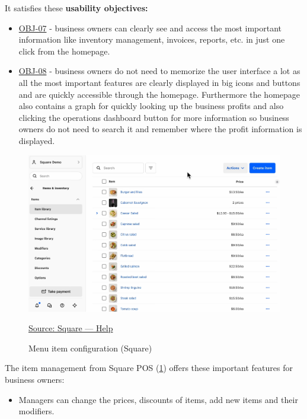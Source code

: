 \documentclass[]{VUMIFTemplateClass}
\begin{document}
It satisfies these \textbf{usability objectives:}

\begin{itemize}
    \item \hyperref[OBJ-07]{OBJ-07} - business owners can clearly see and access the most important information like inventory management, invoices, reports, etc. in just one click from the homepage.
    \item \hyperref[OBJ-08]{OBJ-08} - business owners do not need to memorize the user interface a lot as all the most important features are clearly displayed in big icons and buttons and are quickly accessible through the homepage. Furthermore the homepage also contains a graph for quickly looking up the business profits and also clicking the operations dashboard button for more information so business owners do not need to search it and remember where the profit information is displayed.
\end{itemize}






\begin{figure}[H]
    \centering
    \includegraphics[width=\textwidth]{images/examples/item_menu_square.png}
    \caption{Menu item configuration (Square)}
    \href{https://squareup.com/help/us/en}{Source: Square — Help}
    \label{fig:menu-item}
\end{figure}

The item management from Square POS (\ref{fig:menu-item}) offers these important features for business owners: 

\begin{itemize}
    \item Managers can change the prices, discounts of items, add new items and their modifiers.
\end{itemize}
\end{document}
